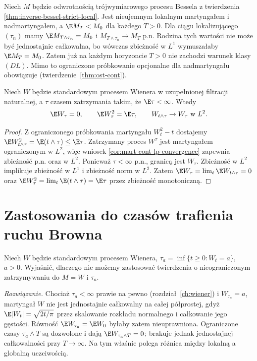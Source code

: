 \begin{przyklad}
Niech $M$ będzie odwrotnością trójwymiarowego
procesu Bessela z twierdzenia
\ref{thm:inverse-bessel-strict-local}.
Jest nieujemnym lokalnym martyngałem
i nadmartyngałem, a $\E M_T<M_0$ dla każdego $T>0$.
Dla ciągu lokalizującego $(\tau_n)$ mamy
$\E M_{T\wedge\tau_n}=M_0$ i
$M_{T\wedge\tau_n}\to M_T$ p.n.
Rodzina tych wartości nie może być jednostajnie
całkowalna, bo wówczas zbieżność w $L^1$
wymuszałaby $\E M_T=M_0$.
Zatem już na każdym horyzoncie $T>0$
nie zachodzi warunek klasy $(DL)$.
Mimo to ograniczone próbkowanie opcjonalne
dla nadmartyngału obowiązuje
(twierdzenie~\ref{thm:ost-cont}).
\end{przyklad}

\begin{wniosek}
\label{cor:brown-integrable-stop}
Niech $W$ będzie standardowym procesem Wienera
w uzupełnionej filtracji naturalnej, a $\tau$
czasem zatrzymania takim, że $\E\tau<\infty$.
Wtedy
\[
\E W_\tau=0,\qquad \E W_\tau^2=\E\tau,
\qquad W_{t\wedge\tau}\to W_\tau
\text{ w }L^2.
\]
\end{wniosek}
\begin{proof}
Z ograniczonego próbkowania martyngału
$W_t^2-t$ dostajemy
$\E W_{t\wedge\tau}^2=\E(t\wedge\tau)
\le\E\tau$.
Zatrzymany proces $W^\tau$ jest martyngałem
ograniczonym w $L^2$, więc wniosek
\ref{cor:mart-cont-lp-convergence}
zapewnia zbieżność p.n. oraz w $L^2$.
Ponieważ $\tau<\infty$ p.n., granicą jest
$W_\tau$. Zbieżność w $L^2$ implikuje
zbieżność w $L^1$ i zbieżność norm w $L^2$.
Zatem $\E W_\tau=\lim_t\E W_{t\wedge\tau}=0$
oraz $\E W_\tau^2=\lim_t\E(t\wedge\tau)
=\E\tau$ przez zbieżność monotoniczną.
\end{proof}

\section{Zastosowania do czasów trafienia ruchu Browna}

\begin{zadanie}
Niech $W$ będzie standardowym procesem Wienera,
$\tau_a=\inf\{t\ge0:W_t=a\}$, $a>0$. Wyjaśnić,
dlaczego nie możemy zastosować twierdzenia o
nieograniczonym zatrzymywaniu do $M=W$ i $\tau_a$.

\emph{Rozwiązanie.} Chociaż $\tau_a<\infty$ prawie
na pewno (rozdział~\ref{ch:wiener})
i $W_{\tau_a}=a$, martyngał $W$ nie jest
jednostajnie całkowalny na całej półprostej,
gdyż $\E|W_t|=\sqrt{2t/\pi}$ przez skalowanie
rozkładu normalnego i całkowanie jego gęstości.
Równość $\E W_{\tau_a}=\E W_0$ byłaby zatem
nieuprawniona. Ograniczone czasy $\tau_a\wedge T$
są dozwolone i dają $\E W_{\tau_a\wedge T}=0$;
brakuje jednak jednostajnej całkowalności przy
$T\to\infty$. Na tym właśnie polega różnica
między lokalną a globalną uczciwością.
\end{zadanie}


